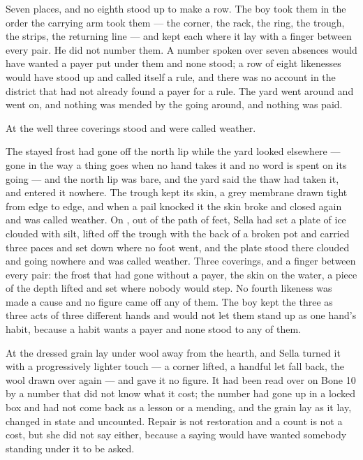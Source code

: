 Seven places, and no eighth stood up to make a row. The boy took them in the order the carrying arm took them --- the corner, the rack, the ring, the trough, the strips, the returning line --- and kept each where it lay with a finger between every pair. He did not number them. A number spoken over seven absences would have wanted a payer put under them and none stood; a row of eight likenesses would have stood up and called itself a rule, and there was no account in the district that had not already found a payer for a rule. The yard went around and went on, and nothing was mended by the going around, and nothing was paid.

At the well three coverings stood and were called weather.

The stayed frost had gone off the north lip while the yard looked elsewhere --- gone in the way a thing goes when no hand takes it and no word is spent on its going --- and the north lip was bare, and the yard said the thaw had taken it, and entered it nowhere. The trough kept its skin, a grey membrane drawn tight from edge to edge, and when a pail knocked it the skin broke and closed again and was called weather. On , out of the path of feet, Sella had set a plate of ice clouded with silt, lifted off the trough with the back of a broken pot and carried three paces and set down where no foot went, and the plate stood there clouded and going nowhere and was called weather. Three coverings, and a finger between every pair: the frost that had gone without a payer, the skin on the water, a piece of the depth lifted and set where nobody would step. No fourth likeness was made a cause and no figure came off any of them. The boy kept the three as three acts of three different hands and would not let them stand up as one hand's habit, because a habit wants a payer and none stood to any of them.

At  the dressed grain lay under wool away from the hearth, and Sella turned it with a progressively lighter touch --- a corner lifted, a handful let fall back, the wool drawn over again --- and gave it no figure. It had been read over on Bone 10 by a number that did not know what it cost; the number had gone up  in a locked box and had not come back as a lesson or a mending, and the grain lay as it lay, changed in state and uncounted. Repair is not restoration and a count is not a cost, but she did not say either, because a saying would have wanted somebody standing under it to be asked.

